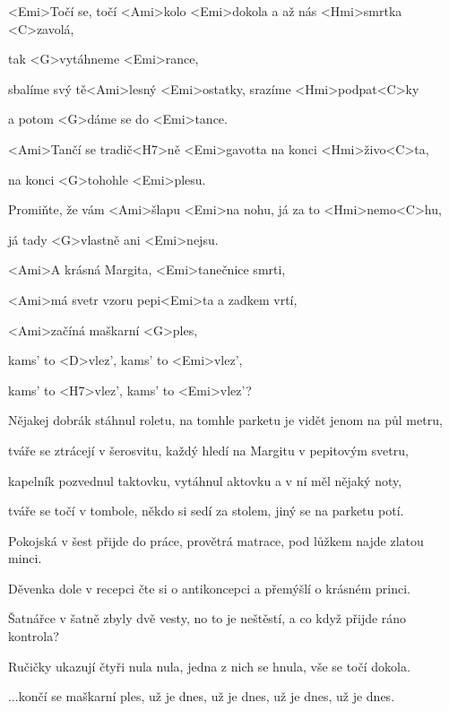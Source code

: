 

\zs
<Emi>Točí se, točí <Ami>kolo <Emi>dokola a až nás <Hmi>smrtka <C>zavolá,

tak <G>vytáhneme <Emi>rance,

sbalíme svý tě<Ami>lesný <Emi>ostatky, srazíme <Hmi>podpat<C>ky

a potom <G>dáme se do <Emi>tance.

<Ami>Tančí se tradič<H7>ně <Emi>gavotta na konci <Hmi>živo<C>ta,

na konci <G>tohohle <Emi>plesu.

Promiňte, že vám <Ami>šlapu <Emi>na nohu, já za to <Hmi>nemo<C>hu,

já tady <G>vlastně ani <Emi>nejsu.
\ks

\zr
<Ami>A krásná Margita, <Emi>tanečnice smrti,

<Ami>má svetr vzoru pepi<Emi>ta a zadkem vrtí,

<Ami>začíná maškarní <G>ples,

kams' to <D>vlez', kams' to <Emi>vlez',

kams' to <H7>vlez', kams' to <Emi>vlez'?
\kr

\zs
Nějakej dobrák stáhnul roletu, na tomhle parketu je vidět jenom na půl metru,

tváře se ztrácejí v šerosvitu, každý hledí na Margitu v pepitovým svetru,

kapelník pozvednul taktovku, vytáhnul aktovku a v ní měl nějaký noty,

tváře se točí v tombole, někdo si sedí za stolem, jiný se na parketu potí.
\ks

\zr\kr

\zs
Pokojská v šest přijde do práce, provětrá matrace, pod lůžkem najde zlatou minci.

Děvenka dole v recepci čte si o antikoncepci a přemýšlí o krásném princi.

Šatnářce v šatně zbyly dvě vesty, no to je neštěstí, a co když přijde ráno kontrola?

Ručičky ukazují čtyři nula nula, jedna z nich se hnula, vše se točí dokola.
\ks

\zr
...končí se maškarní ples, už je dnes, už je dnes, už je dnes, už je dnes.
\kr

\kp
